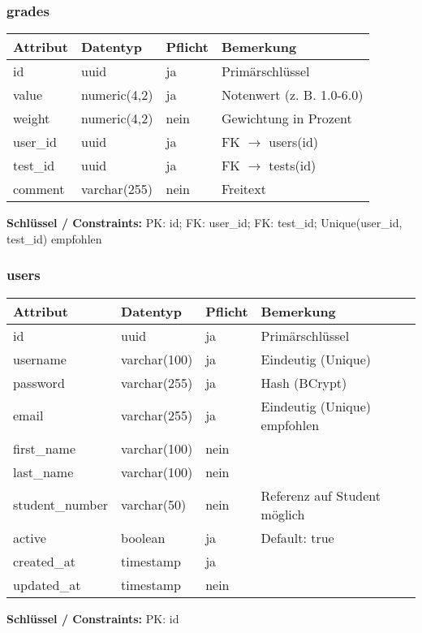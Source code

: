 \documentclass[12pt,a4paper]{article}
\begin{document}
    \subsubsection{grades}
    \begin{longtable}{|L{4cm}|L{3cm}|L{3cm}|L{4cm}|}
        \hline
        \textbf{Attribut} & \textbf{Datentyp} & \textbf{Pflicht} & \textbf{Bemerkung} \\ \hline
        id & uuid & ja & Primärschlüssel \\ \hline
        value & numeric(4,2) & ja & Notenwert (z. B. 1.0-6.0) \\ \hline
        weight & numeric(4,2) & nein & Gewichtung in Prozent \\ \hline
        user\_id & uuid & ja & FK $\rightarrow$ users(id) \\ \hline
        test\_id & uuid & ja & FK $\rightarrow$ tests(id) \\ \hline
        comment & varchar(255) & nein & Freitext \\ \hline
    \end{longtable}
    \textbf{Schlüssel / Constraints:} PK: id; FK: user\_id; FK: test\_id; Unique(user\_id, test\_id) empfohlen

    \subsubsection{users}
    \begin{longtable}{|L{4cm}|L{3cm}|L{3cm}|L{4cm}|}
        \hline
        \textbf{Attribut} & \textbf{Datentyp} & \textbf{Pflicht} & \textbf{Bemerkung} \\ \hline
        id & uuid & ja & Primärschlüssel \\ \hline
        username & varchar(100) & ja & Eindeutig (Unique) \\ \hline
        password & varchar(255) & ja & Hash (BCrypt) \\ \hline
        email & varchar(255) & ja & Eindeutig (Unique) empfohlen \\ \hline
        first\_name & varchar(100) & nein &  \\ \hline
        last\_name & varchar(100) & nein &  \\ \hline
        student\_number & varchar(50) & nein & Referenz auf Student möglich \\ \hline
        active & boolean & ja & Default: true \\ \hline
        created\_at & timestamp & ja &  \\ \hline
        updated\_at & timestamp & nein &  \\ \hline
    \end{longtable}
    \textbf{Schlüssel / Constraints:} PK: id
\end{document}
